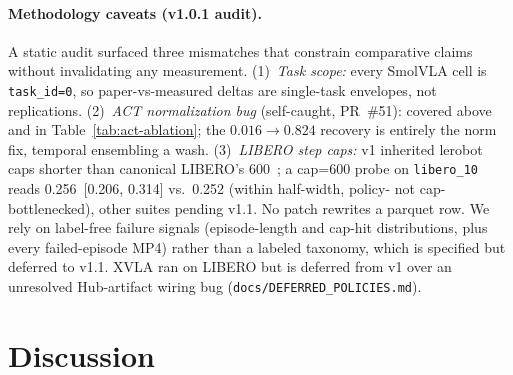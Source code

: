 \documentclass[10pt]{article}
\begin{document}
\paragraph{Methodology caveats (v1.0.1 audit).}
\label{sec:results-audit}
A static audit surfaced three mismatches that constrain comparative
claims without invalidating any measurement. (1)~\emph{Task scope:} every
SmolVLA cell is \texttt{task\_id=0}, so paper-vs-measured deltas are
single-task envelopes, not replications. (2)~\emph{ACT normalization bug}
(self-caught, PR~\#51): covered above and in Table~\ref{tab:act-ablation};
the $0.016\to0.824$ recovery is entirely the norm fix, temporal ensembling
a wash. (3)~\emph{LIBERO step caps:} v1 inherited lerobot caps shorter than
canonical LIBERO's 600~\cite{liu2023libero}; a cap=600 probe on
\texttt{libero\_10} reads 0.256~[0.206, 0.314] vs.\ 0.252 (within
half-width, policy- not cap-bottlenecked), other suites pending v1.1. No
patch rewrites a parquet row. We rely on label-free failure signals
(episode-length and cap-hit distributions, plus every failed-episode MP4)
rather than a labeled taxonomy, which is specified but deferred to v1.1.
XVLA ran on LIBERO but is deferred from v1 over an unresolved
Hub-artifact wiring bug (\texttt{docs/DEFERRED\_POLICIES.md}).


\section{Discussion}
\end{document}
